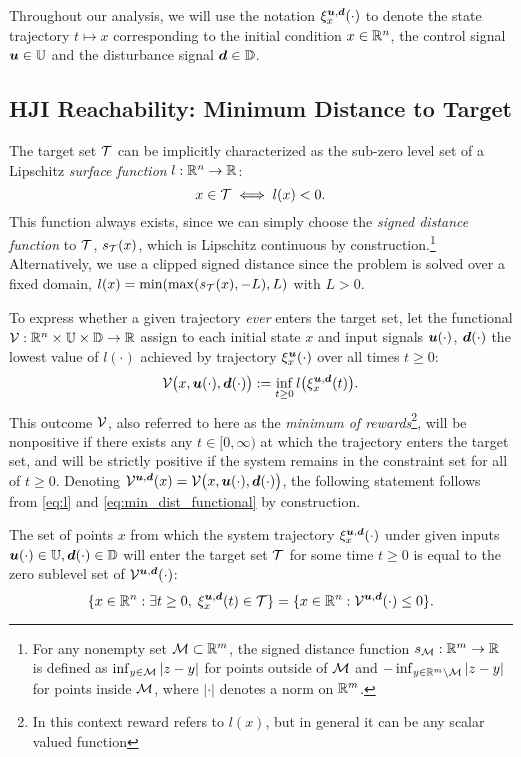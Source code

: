 Throughout our analysis, we will use the notation $\xi_{x}^{\bm{u},\bm{d}}(\cdot)$ to denote the state trajectory $t\mapsto x$ corresponding to the initial condition $x\in\mathbb{R}^n$, the control signal $\bm{u}\in\mathbb{U}$ and the disturbance signal $\bm{d}\in\mathbb{D}$.


\subsection{HJI Reachability: Minimum Distance to Target}
The target set $\mathcal{T}$ can be implicitly characterized as the sub-zero level set of a Lipschitz \emph{surface function} $l:\mathbb{R}^n\rightarrow\mathbb{R}$: 
\begin{equation}\label{eq:l}
x\in\mathcal{T}\iff l(x)<0.
\end{equation}
This function always exists, since we can simply choose the \emph{signed distance function} to $\mathcal{T}$,  $s_{\mathcal{T}}(x)$, which is Lipschitz continuous by construction.\footnote{ For any nonempty set $\mathcal{M}\subset\mathbb{R}^m$, the signed distance function $s_{\mathcal{M}}:\mathbb{R}^m\to\mathbb{R}$  is defined as
$\inf_{y\in\mathcal{M}} |z-y|$ for points outside of $\mathcal{M}$ and $ -\inf_{y\in\mathbb{R}^m\setminus\mathcal{M}} |z-y|$ for points inside $\mathcal{M}$, where $|\cdot|$ denotes a norm on $\mathbb{R}^m$.} 
Alternatively, we use a clipped signed distance since the problem is solved over a fixed domain, $l(x) = \min(\max(s_{\mathcal{T}}(x), -L), L)$ with $L>0$.

To express whether a given trajectory \emph{ever} enters the target set, let the functional $\mathcal{V}:\mathbb{R}^n\times\mathbb{U}\times\mathbb{D}\to\mathbb{R}$ assign to each initial state $x$ and input signals $\bm{u}(\cdot)$, $\bm{d}(\cdot)$ the lowest value of $l(\cdot)$ achieved by trajectory $\xi_{x}^{\bm{u}}(\cdot)$ over all times $t\ge0$: 
\begin{equation}\label{eq:min_dist_functional}
\mathcal{V}\big(x,\bm{u}(\cdot),\bm{d}(\cdot)\big) := \inf_{t\ge 0}l\big(\xi_{x}^{\bm{u},\bm{d}}(t)\big).
\end{equation}
This outcome $\mathcal{V}$, also referred to here as the \emph{minimum of rewards}\footnote{In this context reward refers to $l(x)$, but in general it can be any scalar valued function}, will be nonpositive if there exists any $t\in[0,\infty)$ at which the trajectory enters the target set, and will be strictly positive if the system remains in the constraint set for all of $t\ge 0$. Denoting $\mathcal{V}^{\bm{u},\bm{d}}(x) = \mathcal{V}\big(x,\bm{u}(\cdot),\bm{d}(\cdot)\big)$, the following statement follows from \eqref{eq:l} and \eqref{eq:min_dist_functional} by construction. 

\begin{proposition}\label{Value}
The set of points $x$ from which the system trajectory $\xi^{\bm{u},\bm{d}}_{x}(\cdot)$ under given inputs $\bm{u}(\cdot)\in\mathbb{U},\bm{d}(\cdot)\in\mathbb{D}$ will enter the target set $\mathcal{T}$ for some time $t\ge0$ is equal to the zero sublevel set of $\mathcal{V}^{\bm{u},\bm{d}}(\cdot)$:
\[
\{x\in\mathbb{R}^n: \exists t\ge0,\; \xi^{\bm{u},\bm{d}}_{x}(t)\in\mathcal{T}\}=\{x\in\mathbb{R}^n: \mathcal{V}^{\bm{u},\bm{d}}(\cdot)\le0\}.
\]
\end{proposition}


